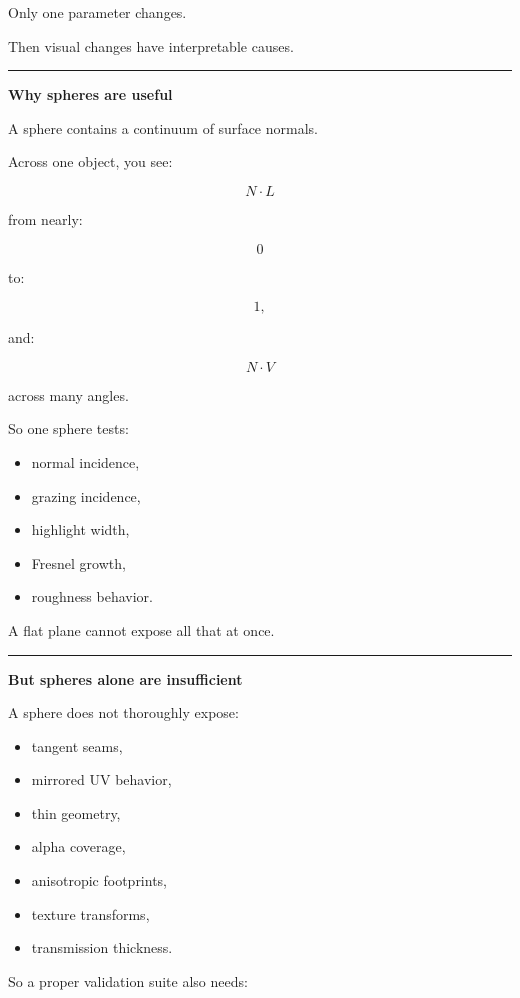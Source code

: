 Only one parameter changes.

Then visual changes have interpretable causes.

\begin{center}\rule{0.5\linewidth}{0.5pt}\end{center}

\textbf{Why spheres are useful}

A sphere contains a continuum of surface normals.

Across one object, you see:

\[
N\cdot L
\]

from nearly:

\[
0
\]

to:

\[
1,
\]

and:

\[
N\cdot V
\]

across many angles.

So one sphere tests:

\begin{itemize}
\tightlist
\item
  normal incidence,
\item
  grazing incidence,
\item
  highlight width,
\item
  Fresnel growth,
\item
  roughness behavior.
\end{itemize}

A flat plane cannot expose all that at once.

\begin{center}\rule{0.5\linewidth}{0.5pt}\end{center}

\textbf{But spheres alone are insufficient}

A sphere does not thoroughly expose:

\begin{itemize}
\tightlist
\item
  tangent seams,
\item
  mirrored UV behavior,
\item
  thin geometry,
\item
  alpha coverage,
\item
  anisotropic footprints,
\item
  texture transforms,
\item
  transmission thickness.
\end{itemize}

So a proper validation suite also needs:


